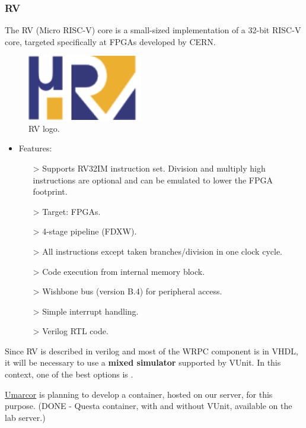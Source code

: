 \subsubsection{\textmu RV}

The \textmu RV \cite{urv-core:ohwr} \cite{urv-core:wiki} \cite{Włostowski:2213516} (Micro RISC-V) core is a small-sized implementation of a 32-bit RISC-V core, targeted specifically at FPGAs developed by CERN. 

\begin{figure}[H]
    \centering
    \includegraphics[width=5cm]{figures/urv_logo.png}
    \caption{\textmu RV logo.}
    \label{fig:urv}
\end{figure}

\begin{itemize}
\item Features:
    \begin{itemize}
    \item[>] Supports RV32IM instruction set. 
Division and multiply high instructions are optional and can be emulated to lower the FPGA footprint.
    \item[>] Target: FPGAs.
    \item[>] 4-stage pipeline (FDXW).
    \item[>] All instructions except taken branches/division in one clock cycle.
    \item[>] Code execution from internal memory block.
    \item[>] Wishbone bus (version B.4) for peripheral access.
    \item[>] Simple interrupt handling.
    \item[>] Verilog RTL code.
    \end{itemize}
\end{itemize}

\noindent Since \textmu RV is described in verilog and most of the WRPC component is in VHDL, it will be necessary to use a \textbf{mixed simulator} supported by VUnit.
In this context, one of the best options is .

\vspace{5mm}

\noindent \href{https://github.com/umarcor}{Umarcor} is planning to develop a container, hosted on our server, for this purpose. 
(DONE - Questa container, with and without VUnit, available on the lab server.)

